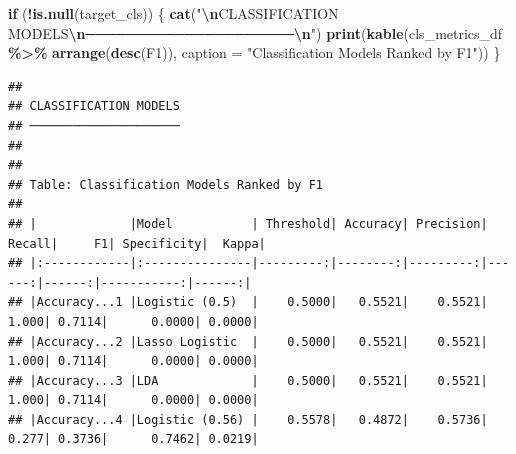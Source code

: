 \documentclass[
]{article}
\newenvironment{Shaded}{\begin{snugshade}}{\end{snugshade}}
\newcommand{\AttributeTok}[1]{\textcolor[rgb]{0.13,0.29,0.53}{#1}}
\newcommand{\ControlFlowTok}[1]{\textcolor[rgb]{0.13,0.29,0.53}{\textbf{#1}}}
\newcommand{\FunctionTok}[1]{\textcolor[rgb]{0.13,0.29,0.53}{\textbf{#1}}}
\newcommand{\NormalTok}[1]{#1}
\newcommand{\SpecialCharTok}[1]{\textcolor[rgb]{0.81,0.36,0.00}{\textbf{#1}}}
\newcommand{\StringTok}[1]{\textcolor[rgb]{0.31,0.60,0.02}{#1}}
\begin{document}
\begin{Shaded}
\begin{Highlighting}[]
\ControlFlowTok{if}\NormalTok{ (}\SpecialCharTok{!}\FunctionTok{is.null}\NormalTok{(target\_cls)) \{}
  \FunctionTok{cat}\NormalTok{(}\StringTok{"}\SpecialCharTok{\textbackslash{}n}\StringTok{CLASSIFICATION MODELS}\SpecialCharTok{\textbackslash{}n}\StringTok{─────────────────────}\SpecialCharTok{\textbackslash{}n}\StringTok{"}\NormalTok{)}
  \FunctionTok{print}\NormalTok{(}\FunctionTok{kable}\NormalTok{(cls\_metrics\_df }\SpecialCharTok{\%\textgreater{}\%} \FunctionTok{arrange}\NormalTok{(}\FunctionTok{desc}\NormalTok{(F1)),}
              \AttributeTok{caption =} \StringTok{"Classification Models Ranked by F1"}\NormalTok{))}
\NormalTok{\}}
\end{Highlighting}
\end{Shaded}

\begin{verbatim}
## 
## CLASSIFICATION MODELS
## ─────────────────────
## 
## 
## Table: Classification Models Ranked by F1
## 
## |             |Model           | Threshold| Accuracy| Precision| Recall|     F1| Specificity|  Kappa|
## |:------------|:---------------|---------:|--------:|---------:|------:|------:|-----------:|------:|
## |Accuracy...1 |Logistic (0.5)  |    0.5000|   0.5521|    0.5521|  1.000| 0.7114|      0.0000| 0.0000|
## |Accuracy...2 |Lasso Logistic  |    0.5000|   0.5521|    0.5521|  1.000| 0.7114|      0.0000| 0.0000|
## |Accuracy...3 |LDA             |    0.5000|   0.5521|    0.5521|  1.000| 0.7114|      0.0000| 0.0000|
## |Accuracy...4 |Logistic (0.56) |    0.5578|   0.4872|    0.5736|  0.277| 0.3736|      0.7462| 0.0219|
\end{verbatim}
\end{document}
